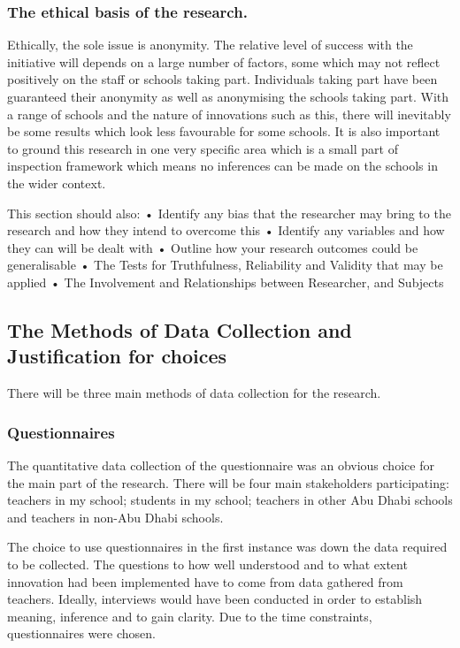 \subsubsection{The ethical basis of the research.}
Ethically, the sole issue is anonymity. The relative level of success with the initiative will depends on a large number of factors, some which may not reflect positively on the staff or schools taking part. Individuals taking part have been guaranteed their anonymity as well as anonymising the schools taking part. With a range of schools and the nature of innovations such as this, there will inevitably be some results which look less favourable for some schools. It is also important to ground this research in one very specific area which is a small part of inspection framework which means no inferences can be made on the schools in the wider context.

This section should also:
•	Identify any bias that the researcher may bring to the research and how they intend to overcome this
•	Identify any variables and how they can will be dealt with
•	Outline how your research outcomes could be generalisable
•	The Tests for Truthfulness, Reliability and Validity that may be applied
•	The Involvement and Relationships between Researcher, and Subjects

\subsection{The Methods of Data Collection and Justification for choices}
There will be three main methods of data collection for the research.

\subsubsection{Questionnaires}
The quantitative data collection of the questionnaire was an obvious choice for the main part of the research. There will be four main stakeholders participating: teachers in my school; students in my school; teachers in other Abu Dhabi schools and teachers in non-Abu Dhabi schools. 

The choice to use questionnaires in the first instance was down the data required to be collected. The questions to how well understood and to what extent innovation had been implemented have to come from data gathered from teachers. Ideally, interviews would have been conducted in order to establish meaning, inference and to gain clarity. Due to the time constraints, questionnaires were chosen. 

